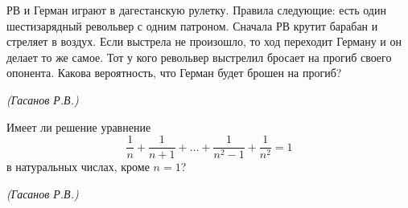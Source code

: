 \newpage

\hspace{3mm}

РВ и Герман играют в дагестанскую рулетку. Правила следующие: есть один шестизарядный револьвер с одним патроном. Сначала РВ крутит барабан и стреляет в воздух. Если выстрела не произошло, то ход переходит Герману и он делает то же самое. Тот у кого револьвер выстрелил бросает на прогиб своего опонента. Какова вероятность, что Герман будет брошен на прогиб?

\begin{flushright}
    \textit{\small{(Гасанов Р.В.)}}
\end{flushright}

\hspace{3mm}

Имеет ли решение уравнение 
\[ \dfrac{1}{n} + \dfrac{1}{n+1} + \ldots + \dfrac{1}{n^2 - 1} + \dfrac{1}{n^2} = 1\]
в натуральных числах, кроме $n = 1$?
\begin{flushright}
    \textit{\small{(Гасанов Р.В.)}}
\end{flushright}
